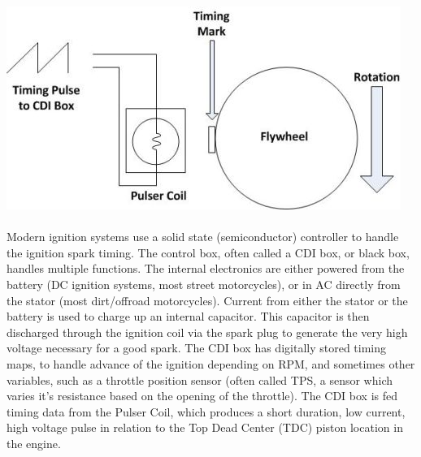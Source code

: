 \documentclass[a4paper]{article}
\begin{document}
\includegraphics[scale=0.7]{pulser-coil-and-timing} \\ \\
Modern ignition systems use a solid state (semiconductor) controller to handle the ignition spark timing. 
The control box, often called a CDI box, or black box, handles multiple functions. 
The internal electronics are either powered from the battery (DC ignition systems, most street motorcycles), or in AC directly from the stator (most dirt/offroad motorcycles). 
Current from either the stator or the battery is used to charge up an internal capacitor. 
This capacitor is then discharged through the ignition coil via the spark plug to generate the very high voltage necessary for a good spark. 
The CDI box has digitally stored timing maps, to handle advance of the ignition depending on RPM, and sometimes other variables, such as a throttle position sensor (often called TPS, a sensor which varies it's resistance based on the opening of the throttle). 
The CDI box is fed timing data from the Pulser Coil, which produces a short duration, low current, high voltage pulse in relation to the Top Dead Center (TDC) piston location in the engine. 
\end{document}
